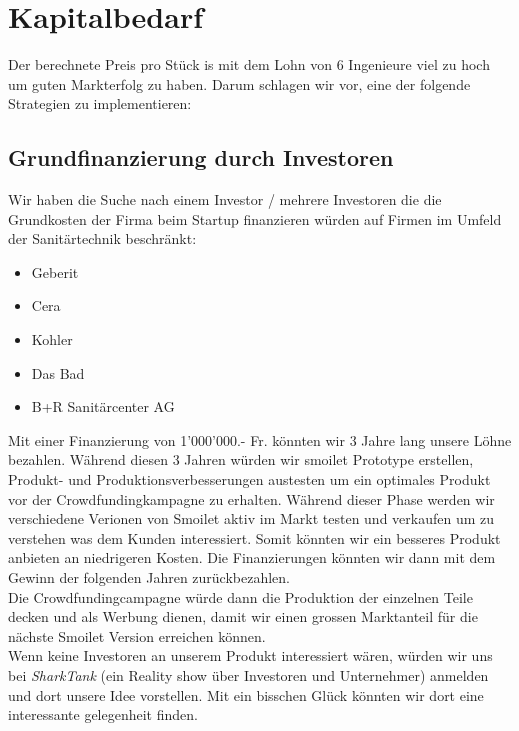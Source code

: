\section{Kapitalbedarf}
Der berechnete Preis pro St\"uck is mit dem Lohn von 6 Ingenieure viel zu hoch um guten Markterfolg zu haben. Darum schlagen wir vor, eine der folgende Strategien zu implementieren:

\subsection{Grundfinanzierung durch Investoren}
Wir haben die Suche nach einem Investor / mehrere Investoren die die Grundkosten der Firma beim Startup finanzieren würden auf Firmen im Umfeld der Sanitärtechnik beschränkt:
\begin{itemize}
\item Geberit
\item Cera
\item Kohler
\item Das Bad
\item B+R Sanitärcenter AG
\end{itemize}
Mit einer Finanzierung von 1'000'000.- Fr. könnten wir 3 Jahre lang unsere L\"ohne bezahlen. Während diesen 3 Jahren würden wir smoilet Prototype erstellen, Produkt- und Produktionsverbesserungen austesten um ein optimales Produkt vor der Crowdfundingkampagne zu erhalten. Während dieser Phase werden wir verschiedene Verionen von Smoilet aktiv im Markt testen und verkaufen um zu verstehen was dem Kunden interessiert. Somit könnten wir ein besseres Produkt anbieten an niedrigeren Kosten. Die Finanzierungen könnten wir dann mit dem Gewinn der folgenden Jahren zurückbezahlen.\\
Die Crowdfundingcampagne würde dann die Produktion der einzelnen Teile decken und als Werbung dienen, damit wir einen grossen Marktanteil für die nächste Smoilet Version erreichen können. \\
Wenn keine Investoren an unserem Produkt interessiert wären, würden wir uns bei \textit{SharkTank} (ein Reality show über Investoren und Unternehmer) anmelden und dort unsere Idee vorstellen. Mit ein bisschen Glück könnten wir dort eine interessante gelegenheit finden.
